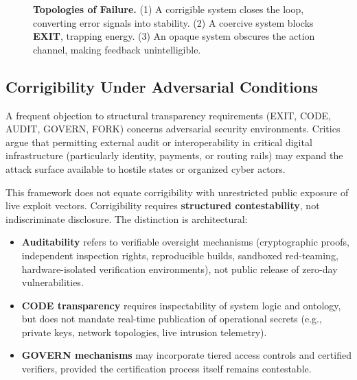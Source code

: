 \documentclass{article}
\begin{document}
\begin{figure}[htbp]
\caption{\textbf{Topologies of Failure.}
(1) A corrigible system closes the loop, converting error signals into stability.
(2) A coercive system blocks \textbf{EXIT}, trapping energy.
(3) An opaque system obscures the action channel, making feedback unintelligible.}
\label{fig:failure_modes}
\end{figure}

\subsection{Corrigibility Under Adversarial Conditions}
\label{subsec:adversarial}

A frequent objection to structural transparency requirements (EXIT, CODE, AUDIT, GOVERN, FORK) concerns adversarial security environments. Critics argue that permitting external audit or interoperability in critical digital infrastructure (particularly identity, payments, or routing rails) may expand the attack surface available to hostile states or organized cyber actors.

This framework does not equate corrigibility with unrestricted public exposure of live exploit vectors. Corrigibility requires \textbf{structured contestability}, not indiscriminate disclosure. The distinction is architectural:

\begin{itemize}[noitemsep]
    \item \textbf{Auditability} refers to verifiable oversight mechanisms (cryptographic proofs, independent inspection rights, reproducible builds, sandboxed red-teaming, hardware-isolated verification environments), not public release of zero-day vulnerabilities.
    \item \textbf{CODE transparency} requires inspectability of system logic and ontology, but does not mandate real-time publication of operational secrets (e.g., private keys, network topologies, live intrusion telemetry).
    \item \textbf{GOVERN mechanisms} may incorporate tiered access controls and certified verifiers, provided the certification process itself remains contestable.
\end{itemize}
\end{document}
